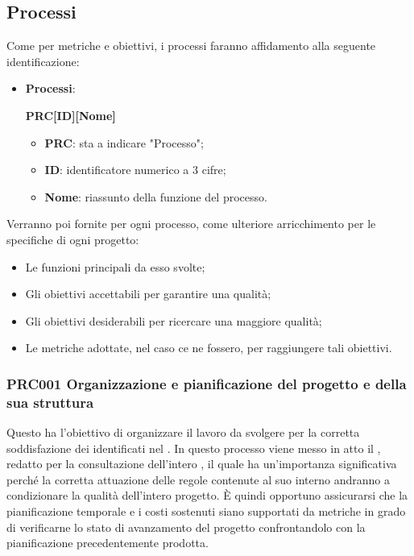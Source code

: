 \documentclass[../piano-di-qualifica.tex]{subfiles}
\begin{document}
\subsection{Processi}%
\label{sub:processi}
Come per metriche e obiettivi, i processi faranno affidamento alla seguente identificazione:
\begin{itemize}
    \item \textbf{Processi}: 
    \begin{center}
        \centering
        \textbf{PRC[ID][Nome]}
    \end{center}
    \begin{itemize}
        \item \textbf{PRC}: sta a indicare "Processo";
        \item \textbf{ID}: identificatore numerico a 3 cifre;
        \item \textbf{Nome}: riassunto della funzione del processo.
    \end{itemize}
\end{itemize}
Verranno poi fornite per ogni processo, come ulteriore arricchimento per le specifiche di ogni progetto:
\begin{itemize}
    \item Le funzioni principali da esso svolte;
    \item Gli obiettivi accettabili per garantire una qualità;
    \item Gli obiettivi desiderabili per ricercare una maggiore qualità;
    \item Le metriche adottate, nel caso ce ne fossero, per raggiungere tali obiettivi.
\end{itemize}

\subsubsection{PRC001 Organizzazione e pianificazione del progetto e della sua struttura}%
\label{sub:organizzazione_e_pianificazione_del_progetto_e_della_sua_struttura}
Questo  ha l'obiettivo di organizzare il lavoro da svolgere per la corretta soddisfazione dei  identificati nel .
In questo processo viene messo in atto il , redatto per la consultazione dell'intero , il quale ha un'importanza significativa perché la corretta attuazione delle regole contenute al suo interno andranno a condizionare la qualità dell'intero progetto.
È quindi opportuno assicurarsi che la pianificazione temporale e i costi sostenuti siano supportati da metriche in grado di verificarne lo stato di avanzamento del progetto confrontandolo con la pianificazione precedentemente prodotta.
\end{document}
